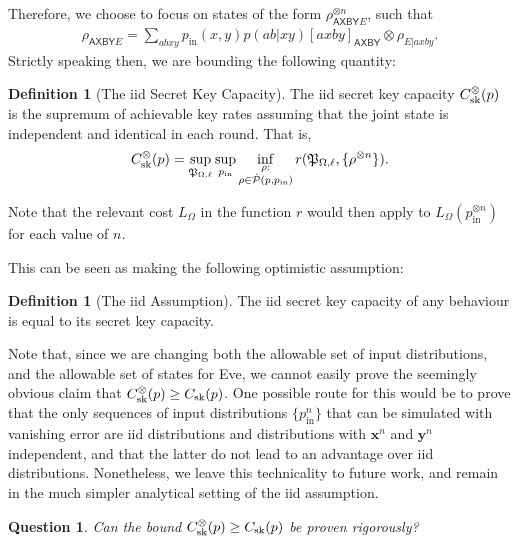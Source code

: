 \documentclass[10pt, a4paper]{article}
\numberwithin{equation}{section} %
\newcounter{stmt} %
\theoremstyle{definition}
\newtheorem{defn}[stmt]{Definition}
\theoremstyle{plain}
\newtheorem{question}{Question}
\newcommand{\?}{\mathrel{?}} %
\newcommand{\cvec}[1]{\boldsymbol{\mathbf{#1}}}    %
\newcommand{\crv}[1]{\mathsf{#1}}
\newcommand{\proj}[2][]{{[#2]}_{#1}}
\newcommand{\compatstates}[3][]{\hat{\mathcal{P}}#1(#2,#3)}
\newcommand{\proto}[2][_{\Omega,\ell}]{\mathfrak{#2}#1}
\newcommand{\prin}[1][p]{#1_{\mathrm{in}}}
\newcommand{\sk}{\rm sk}
\begin{document}
    Therefore, we choose to focus on states of the form \( \rho_{\crv{AXBY}E}^{\otimes n} \), such that
    \begin{align}
      \rho_{\crv{AXBY}E} = \sum_{abxy} \prin(x,y) p(ab|xy) \proj[\crv{AXBY}]{axby} \otimes \rho_{E|axby}.
    \end{align}
    Strictly speaking then, we are bounding the following quantity:
    \begin{defn}[The iid Secret Key Capacity]\label{def:seckeycapbehaviid}
      The iid secret key capacity \(C_{\sk}^{\otimes}(p)\) is the supremum of achievable key rates assuming that the joint state is independent and identical in each round. That is,
      \begin{equation}
        C_{\sk}^{\otimes}(p) = \sup_{\proto{P}} \sup_{\prin} \inf_{\substack{\rho : \\ \rho \in \compatstates{p}{\prin}}} r(\proto{P}, \{\rho^{\otimes{n}}\}).
      \end{equation}
    \end{defn}
    Note that the relevant cost \(L_{\Omega}\) in the function \(r\) would then apply to \(L_{\Omega}(\prin^{\otimes n})\) for each value of \(n\).

    This can be seen as making the following optimistic assumption:
    \begin{defn}[The iid Assumption]
      The iid secret key capacity of any behaviour is equal to its secret key capacity.
    \end{defn}
    Note that, since we are changing both the allowable set of input distributions, and the allowable set of states for Eve, we cannot easily prove the seemingly obvious claim that \(C_{\sk}^{\otimes}(p) \geq C_{\sk}(p)\). One possible route for this would be to prove that the only sequences of input distributions \(\{\prin^n\}\) that can be simulated with vanishing error are iid distributions and distributions with \(\cvec{x}^n\) and \(\cvec{y}^n\) independent, and that the latter do not lead to an advantage over iid distributions. Nonetheless, we leave this technicality to future work, and remain in the much simpler analytical setting of the iid assumption.

    \begin{question}
      Can the bound \(C_{\sk}^{\otimes}(p) \geq C_{\sk}(p)\) be proven rigorously?
    \end{question}
\end{document}
